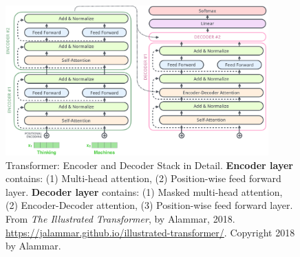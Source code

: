 \begin{frame}{}
    \vspace{10pt}
    
    
    
    
    
    \begin{figure}[h]
    \vspace{-10pt}
    \centering
    \includegraphics[width=0.9\textwidth]{imgs/encoderDecoderLayersDetailed.png}
    \vspace{-5pt}
    \caption{\scriptsize Transformer: Encoder and Decoder Stack in Detail. \textbf{Encoder layer} contains: (1) Multi-head attention, (2) Position-wise feed forward layer. \textbf{Decoder layer} contains: (1) Masked multi-head attention, (2) Encoder-Decoder attention, (3) Position-wise feed forward layer. From \emph{The Illustrated Transformer}, by Alammar, 2018. \url{https://jalammar.github.io/illustrated-transformer/}. Copyright 2018 by Alammar. }
    \label{fig:encDecLayersDetailed}
    \end{figure}
    
\end{frame}





